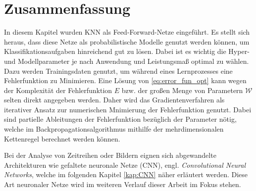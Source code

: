 \section{Zusammenfassung}
\label{abs:NN_conc}
In diesem Kapitel wurden KNN als Feed-Forward-Netze eingeführt. Es stellt sich heraus, dass diese Netze als probabilistische Modelle genutzt werden können, um Klassifikationsaufgaben hinreichend gut zu lösen. Dabei ist es wichtig die Hyper- und Modellparameter je nach Anwendung und Leistungsmaß optimal zu wählen. Dazu werden Trainingsdaten genutzt, um während eines Lernprozesses eine Fehlerfunktion zu Minimieren. Eine Lösung von \ref{eq:error_fun_opt} kann wegen der Komplexität der Fehlerfunktion $E$ bzw. der großen Menge von Parametern $\mathcal{W}$ selten direkt angegeben werden\cite{blum1992training}. Daher wird das Gradientenverfahren als iterativer Ansatz zur numerischen Mnimierung der Fehlerfunktion genutzt. Dabei sind partielle Ableitungen der Fehlerfunktion bezüglich der Parameter nötig, welche im Backpropagationsalgorithmus mithilfe der mehrdimensionalen Kettenregel berechnet werden können. 

Bei der Analyse von Zeitreihen oder Bildern eignen sich abgewandelte Architekturen wie gefaltete neuronale Netze (CNN), engl. \textit{Convolutional Neural Networks}, welche im folgenden Kapitel \ref{kap:CNN} näher erläutert werden. Diese Art neuronaler Netze wird im weiteren Verlauf dieser Arbeit im Fokus stehen.


    





